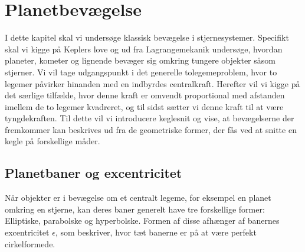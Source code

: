 \chapter{Planetbevægelse}\label{cha:Planet}
I dette kapitel skal vi undersøge klassisk bevægelse i stjernesystemer. Specifikt skal vi kigge på Keplers love og ud fra Lagrangemekanik undersøge, hvordan planeter, kometer og lignende bevæger sig omkring tungere objekter såsom stjerner. Vi vil tage udgangspunkt i det generelle tolegemeproblem, hvor to legemer påvirker hinanden med en indbyrdes centralkraft. Herefter vil vi kigge på det særlige tilfælde, hvor denne kraft er omvendt proportional med afstanden imellem de to legemer kvadreret, og til sidst sætter vi denne kraft til at være tyngdekraften. Til dette vil vi introducere keglesnit og vise, at bevægelserne der fremkommer kan beskrives ud fra de geometriske former, der fås ved at snitte en kegle på forskellige måder.


\section{Planetbaner og excentricitet}
Når objekter er i bevægelse om et centralt legeme, for eksempel en planet omkring en stjerne, kan deres baner generelt have tre forskellige former: Elliptiske, parabolske og hyperbolske. Formen af disse afhænger af banernes excentricitet $\epsilon$, som beskriver, hvor tæt banerne er på at være perfekt cirkelformede.

